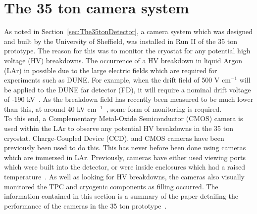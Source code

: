 
\chapter{The 35 ton camera system}  %



\graphicspath{{The35tonCameras/Figs/Raster/}{The35tonCameras/Figs/PDF/}{The35tonCameras/Figs/Vector/}}

As noted in Section~\ref{sec:The35tonDetector}, a camera system which was designed and built by the University of Sheffield, was installed in Run II of the 35 ton prototype. The reason for this was to monitor the cryostat for any potential high voltage (HV) breakdowns. The occurrence of a HV breakdown in liquid Argon (LAr) in possible due to the large electric fields which are required for experiments such as DUNE. For example, when the drift field of 500 V cm$^{-1}$ will be applied to the DUNE far detector (FD), it will require a nominal drift voltage of -190 kV~\citep{DUNECDR}. As the breakdown field has recently been measured to be much lower than this, at around 40 kV cm$^{-1}$~\citep{BlatterEField}, some form of monitoring is required. \\

To this end, a Complementary Metal-Oxide Semiconductor (CMOS) camera is used within the LAr to observe any potential HV breakdowns in the 35 ton cryostat. Charge-Coupled Device (CCD), and CMOS cameras have been previously been used to do this. This has never before been done using cameras which are immersed in LAr. Previously, cameras have either used viewing ports which were built into the detector, or were inside enclosures which had a raised temperature~\citep{BlatterEField,BERNcam,LAPD,Liverpool,Weizmannbubbles}. As well as looking for HV breakdowns, the cameras also visually monitored the TPC and cryogenic components as filling occurred. The information contained in this section is a summary of the paper detailing the performance of the cameras in the 35 ton prototype~\citep{CameraPaper}. \\

